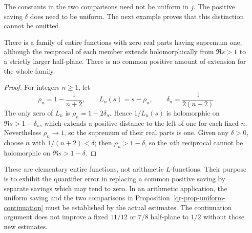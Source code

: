 The constants in the two comparisons need not be uniform in $j$.
The positive saving $\delta$ does need to be uniform. The next
example proves that this distinction cannot be omitted.

\begin{proposition}\label{qr-prop-nonuniform-family}
There is a family of entire functions with zero real parts having
supremum one, although the reciprocal of each member extends
holomorphically from $\Re s>1$ to a strictly larger half-plane.
There is no common positive amount of extension for the whole family.
\end{proposition}

\begin{proof}
For integers $n\geq1$, let
\[
 \rho_n=1-\frac1{n+2},\qquad L_n(s)=s-\rho_n,
 \qquad\delta_n=\frac1{2(n+2)}.
\]
The only zero of $L_n$ is $\rho_n=1-2\delta_n$.
Hence $1/L_n(s)$ is holomorphic on $\Re s>1-\delta_n$,
which extends a positive distance to the left of one for each
fixed $n$. Nevertheless $\rho_n\to1$, so the supremum of their
real parts is one. Given any $\delta>0$, choose $n$ with
$1/(n+2)<\delta$; then $\rho_n>1-\delta$, so the $n$th reciprocal
cannot be holomorphic on $\Re s>1-\delta$.
\end{proof}

These are elementary entire functions, not arithmetic $L$-functions.
Their purpose is to exhibit the quantifier error in replacing a
common positive saving by separate savings which may tend to zero.
In an arithmetic application, the uniform saving and the two
comparisons in Proposition~\ref{qr-prop-uniform-continuation} must
be established by the actual estimates. The continuation argument
does not improve a fixed $11/12$ or $7/8$ half-plane to $1/2$
without those new estimates.
